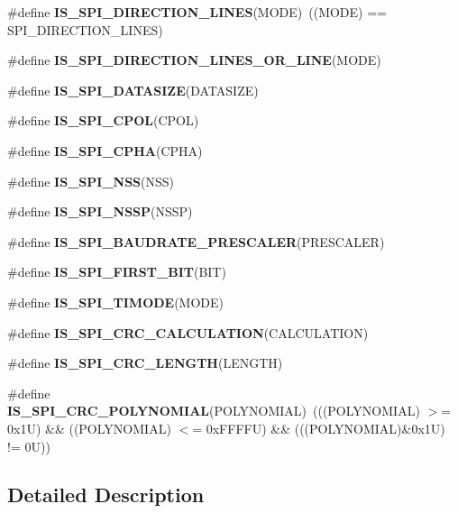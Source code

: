 \begin{DoxyCompactItemize}
\mbox{\label{group___s_p_i___private___macros_ga79454622381b22d02c8cdd3346c80f78}} 
\#define {\bfseries I\+S\+\_\+\+S\+P\+I\+\_\+\+D\+I\+R\+E\+C\+T\+I\+O\+N\+\_\+L\+I\+N\+ES}(M\+O\+DE)~((M\+O\+DE) == S\+P\+I\+\_\+\+D\+I\+R\+E\+C\+T\+I\+O\+N\+\_\+L\+I\+N\+ES)
\item 
\#define {\bfseries I\+S\+\_\+\+S\+P\+I\+\_\+\+D\+I\+R\+E\+C\+T\+I\+O\+N\+\_\+L\+I\+N\+E\+S\+\_\+\+O\+R\+\_\+L\+I\+NE}(M\+O\+DE)
\item 
\#define {\bfseries I\+S\+\_\+\+S\+P\+I\+\_\+\+D\+A\+T\+A\+S\+I\+ZE}(D\+A\+T\+A\+S\+I\+ZE)
\item 
\#define {\bfseries I\+S\+\_\+\+S\+P\+I\+\_\+\+C\+P\+OL}(C\+P\+OL)
\item 
\#define {\bfseries I\+S\+\_\+\+S\+P\+I\+\_\+\+C\+P\+HA}(C\+P\+HA)
\item 
\#define {\bfseries I\+S\+\_\+\+S\+P\+I\+\_\+\+N\+SS}(N\+SS)
\item 
\#define {\bfseries I\+S\+\_\+\+S\+P\+I\+\_\+\+N\+S\+SP}(N\+S\+SP)
\item 
\#define {\bfseries I\+S\+\_\+\+S\+P\+I\+\_\+\+B\+A\+U\+D\+R\+A\+T\+E\+\_\+\+P\+R\+E\+S\+C\+A\+L\+ER}(P\+R\+E\+S\+C\+A\+L\+ER)
\item 
\#define {\bfseries I\+S\+\_\+\+S\+P\+I\+\_\+\+F\+I\+R\+S\+T\+\_\+\+B\+IT}(B\+IT)
\item 
\#define {\bfseries I\+S\+\_\+\+S\+P\+I\+\_\+\+T\+I\+M\+O\+DE}(M\+O\+DE)
\item 
\#define {\bfseries I\+S\+\_\+\+S\+P\+I\+\_\+\+C\+R\+C\+\_\+\+C\+A\+L\+C\+U\+L\+A\+T\+I\+ON}(C\+A\+L\+C\+U\+L\+A\+T\+I\+ON)
\item 
\#define {\bfseries I\+S\+\_\+\+S\+P\+I\+\_\+\+C\+R\+C\+\_\+\+L\+E\+N\+G\+TH}(L\+E\+N\+G\+TH)
\item 
\mbox{\label{group___s_p_i___private___macros_ga76eec5bbb44c873aa52966a9cb6c8f8c}} 
\#define {\bfseries I\+S\+\_\+\+S\+P\+I\+\_\+\+C\+R\+C\+\_\+\+P\+O\+L\+Y\+N\+O\+M\+I\+AL}(P\+O\+L\+Y\+N\+O\+M\+I\+AL)~(((P\+O\+L\+Y\+N\+O\+M\+I\+AL) $>$= 0x1\+U) \&\& ((\+P\+O\+L\+Y\+N\+O\+M\+I\+A\+L) $<$= 0x\+F\+F\+F\+F\+U) \&\& (((\+P\+O\+L\+Y\+N\+O\+M\+I\+A\+L)\&0x1\+U) != 0\+U))
\end{DoxyCompactItemize}


\subsection{Detailed Description}


